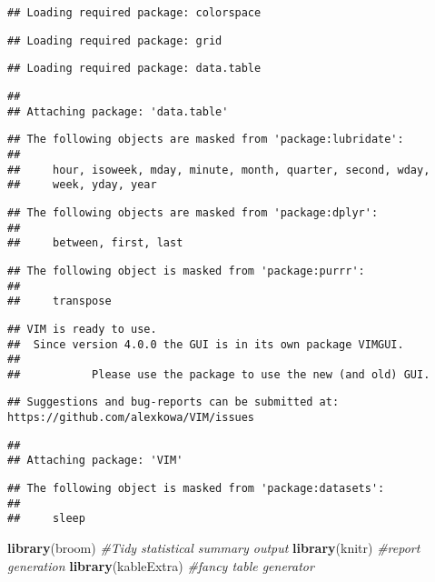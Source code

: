 \documentclass[]{article}
\newenvironment{Shaded}{\begin{snugshade}}{\end{snugshade}}
\newcommand{\CommentTok}[1]{\textcolor[rgb]{0.56,0.35,0.01}{\textit{#1}}}
\newcommand{\KeywordTok}[1]{\textcolor[rgb]{0.13,0.29,0.53}{\textbf{#1}}}
\newcommand{\NormalTok}[1]{#1}
\begin{document}
\begin{verbatim}
## Loading required package: colorspace
\end{verbatim}

\begin{verbatim}
## Loading required package: grid
\end{verbatim}

\begin{verbatim}
## Loading required package: data.table
\end{verbatim}

\begin{verbatim}
## 
## Attaching package: 'data.table'
\end{verbatim}

\begin{verbatim}
## The following objects are masked from 'package:lubridate':
## 
##     hour, isoweek, mday, minute, month, quarter, second, wday,
##     week, yday, year
\end{verbatim}

\begin{verbatim}
## The following objects are masked from 'package:dplyr':
## 
##     between, first, last
\end{verbatim}

\begin{verbatim}
## The following object is masked from 'package:purrr':
## 
##     transpose
\end{verbatim}

\begin{verbatim}
## VIM is ready to use. 
##  Since version 4.0.0 the GUI is in its own package VIMGUI.
## 
##           Please use the package to use the new (and old) GUI.
\end{verbatim}

\begin{verbatim}
## Suggestions and bug-reports can be submitted at: https://github.com/alexkowa/VIM/issues
\end{verbatim}

\begin{verbatim}
## 
## Attaching package: 'VIM'
\end{verbatim}

\begin{verbatim}
## The following object is masked from 'package:datasets':
## 
##     sleep
\end{verbatim}

\begin{Shaded}
\begin{Highlighting}[]
\KeywordTok{library}\NormalTok{(broom)      }\CommentTok{#Tidy statistical summary output}
\KeywordTok{library}\NormalTok{(knitr)      }\CommentTok{#report generation}
\KeywordTok{library}\NormalTok{(kableExtra) }\CommentTok{#fancy table generator}
\end{Highlighting}
\end{Shaded}
\end{document}

